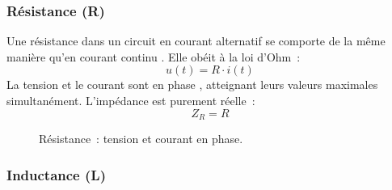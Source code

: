 \subsubsection{R\'esistance (R)}
Une r\'esistance dans un circuit en courant alternatif se comporte de la m\^eme manière qu'en courant continu . Elle ob\'eit à la loi d'Ohm~:
\[
u(t) = R \cdot i(t)
\]
La tension et le courant sont en phase , atteignant leurs valeurs maximales simultan\'ement. L'imp\'edance est purement r\'eelle~:
\[
Z_R = R
\]
\begin{figure}[h!]
    \centering
    \caption{R\'esistance~: tension et courant en phase.}
    \label{fig:R_phase}
\end{figure}

\subsubsection{Inductance (L)}
